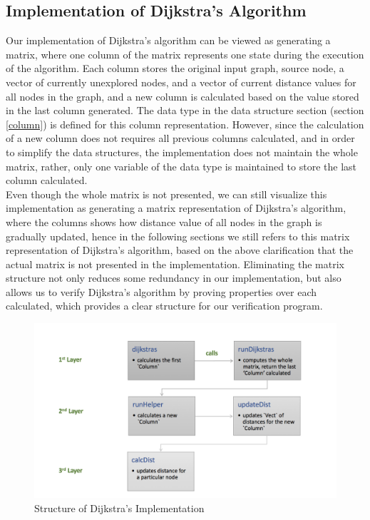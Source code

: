 \subsection{Implementation of Dijkstra's Algorithm} \label{implementation}
Our implementation of Dijkstra's algorithm can be viewed as generating a matrix, where one column of the matrix represents one state during the execution of the algorithm. Each column stores the original input graph, source node, a vector of currently unexplored nodes, and a vector of current distance values for all nodes in the graph, and a new column is calculated based on the value stored in the last column generated. The  data type in the data structure section (section \ref{column}) is defined for this column representation. However, since the calculation of a new column does not requires all previous columns calculated, and in order to simplify the data structures, the implementation does not maintain the whole matrix, rather, only one variable of the  data type is maintained to store the last column calculated. 
\\

Even though the whole matrix is not presented, we can still visualize this implementation as generating a matrix representation of Dijkstra's algorithm, where the columns shows how distance value of all nodes in the graph is gradually updated, hence in the following sections we still refers to this matrix representation of Dijkstra's algorithm, based on the above clarification that the actual matrix is not presented in the implementation. Eliminating the matrix structure not only reduces some redundancy in our implementation, but also allows us to verify Dijkstra's algorithm by proving properties over each  calculated, which provides a clear structure for our verification program.

\begin{figure}[H]
	\centering
	\includegraphics[scale = 0.6]{./figure/dijkstras_funcs.png}
	\caption{Structure of Dijkstra's Implementation}
	\label{figure3}
\end{figure}

